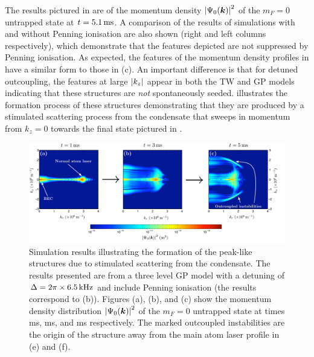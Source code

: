 The results pictured in  are of the momentum density $\left|\Psi_0(\bm{k})\right|^2$ of the $m_F=0$ untrapped state at $t=\unit[5.1]{ms}$.  A comparison of the results of simulations with and without Penning ionisation are also shown (right and left columns respectively), which demonstrate that the features depicted are not suppressed by Penning ionisation.  As expected, the features of the momentum density profiles in  have a similar form to those in (c).  An important difference is that for detuned outcoupling, the features at large $\left|k_z\right|$ appear in both the TW and GP models indicating that these structures are \emph{not} spontaneously seeded.   illustrates the formation process of these structures demonstrating that they are produced by a stimulated scattering process from the condensate that sweeps in momentum from $k_z=0$ towards the final state pictured in . 

\begin{figure}
    \centering
    \includegraphics[width=20cm]{DetunedPeaksFormationProcess}
    \caption{Simulation results illustrating the formation of the peak-like structures due to stimulated scattering from the condensate. The results presented are from a three level GP model with a detuning of $\Delta = 2\pi \times \unit[6.5]{kHz}$ and include Penning ionisation (the results correspond to (b)). Figures (a), (b), and (c) show the momentum density distribution $\left|\Psi_0(\bm{k})\right|^2$ of the $m_F=0$ untrapped state at times \unit[1]{ms}, \unit[3]{ms}, and \unit[5]{ms} respectively. The marked outcoupled instabilities are the origin of the structure away from the main atom laser profile in (e) and (f).
    \label{Peaks:DetunedPeaksFormationProcess}}
\end{figure}

